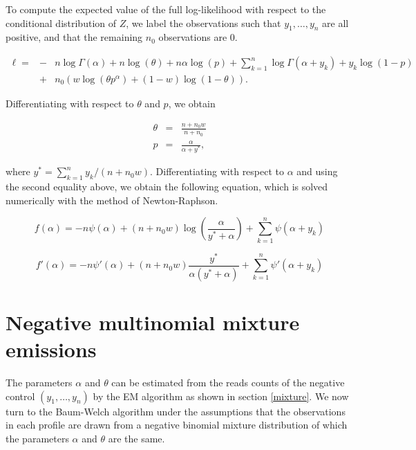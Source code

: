 \documentclass[12pt]{article}
\begin{document}
\begin{appendices}
    To compute the expected value of the full log-likelihood with
    respect to the conditional distribution of $Z$, we label the
    observations such that $y_1, \ldots, y_n$ are all positive, and
    that the remaining $n_0$ observations are 0.

    \begin{eqnarray*}
      \ell = &-&n \log \Gamma(\alpha) + n\log (\theta) +
      n \alpha \log(p) +
      \sum_{k=1}^n \log \Gamma(\alpha + y_k) + y_k \log (1-p) \\
      &+& n_0 \left( w \log(\theta p^{\alpha}) +
    (1-w) \log(1-\theta) \right).
    \end{eqnarray*}

    Differentiating with respect to $\theta$ and $p$, we obtain

    \begin{eqnarray*}
      \theta &=& \frac{n+n_0w}{n+n_0} \\
      p &=& \frac{\alpha}{\alpha + y^*},
    \end{eqnarray*}

    \noindent
    where $y^* = \sum_{k=1}^ny_k/(n+n_0w)$.
    Differentiating with respect to $\alpha$ and using the second
    equality above, we obtain the following equation, which is solved
    numerically with the method of Newton-Raphson.

    \begin{equation}
      f(\alpha) = -n \psi(\alpha) + (n+n_0w) \log \left(\frac{\alpha}{y^*
      + \alpha} \right) + \sum_{k=1}^n \psi(\alpha + y_k)
    \end{equation}

    \begin{equation}
      f'(\alpha) = -n \psi'(\alpha) + (n+n_0w)
      \frac{y^*}{\alpha(y^*+\alpha)} + \sum_{k=1}^n \psi'(\alpha + y_k)
    \end{equation}

    \section{Negative multinomial mixture emissions}

    The parameters $\alpha$ and $\theta$ can be estimated from the
    reads counts of the negative control $(y_1, \ldots, y_n)$ by
    the EM algorithm as shown in section \ref{mixture}. We now
    turn to the Baum-Welch algorithm under the assumptions that
    the observations in each profile are drawn from a negative
    binomial mixture distribution of which the parameters $\alpha$
    and $\theta$ are the same.


\end{appendices}
\end{document}
